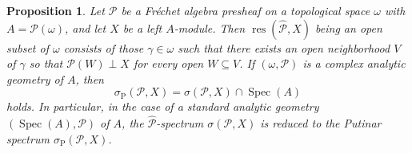 \documentclass[12pt]{amsart}%
\theoremstyle{plain}
\newtheorem{proposition}{Proposition}
\numberwithin{equation}{section}
\numberwithin{equation}{section}
\numberwithin{theorem}{section}
\numberwithin{lemma}{section}
\numberwithin{remark}{section}
\numberwithin{example}{section}
\numberwithin{proposition}{section}
\numberwithin{definition}{section}
\numberwithin{corollary}{section}
\begin{document}
\begin{proposition}
\label{remPut1}Let $\mathcal{P}$ be a Fr\'{e}chet algebra presheaf on a
topological space $\omega$ with $A=\mathcal{P}\left(  \omega\right)  $, and
let $X$ be a left $A$-module. Then $\operatorname{res}\left(
\widehat{\mathcal{P}},X\right)  $ being an open subset of $\omega$ consists of
those $\gamma\in\omega$ such that there exists an open neighborhood $V$ of
$\gamma$ so that $\mathcal{P}\left(  W\right)  \perp X$ for every open
$W\subseteq V$. If $\left(  \omega,\mathcal{P}\right)  $ is a complex analytic
geometry of $A$, then
\[
\sigma_{\operatorname{P}}\left(  \mathcal{P},X\right)  =\sigma\left(
\mathcal{P},X\right)  \cap\operatorname{Spec}\left(  A\right)
\]
holds. In particular, in the case of a standard analytic geometry $\left(
\operatorname{Spec}\left(  A\right)  ,\mathcal{P}\right)  $ of $A$, the
$\widehat{\mathcal{P}}$-spectrum $\sigma\left(  \mathcal{P},X\right)  $ is
reduced to the Putinar spectrum $\sigma_{\operatorname{P}}\left(
\mathcal{P},X\right)  $.
\end{proposition}
\end{document}
